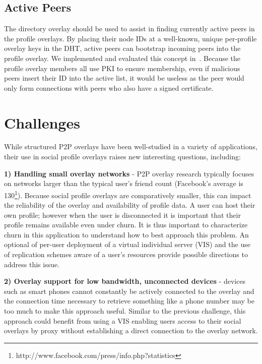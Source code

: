 \documentclass[letterpaper,twocolumn,10pt]{article}
\begin{document}
\subsection{Active Peers}
The directory overlay should be used to assist in finding currently active peers
in the profile overlays.  By placing their node IDs at a well-known, unique
per-profile overlay keys in the DHT, active peers can bootstrap incoming peers
into the profile overlay.  We implemented and evaluated this concept
in~\cite{icdcs10}.  Because the profile overlay members all use PKI to ensure
membership, even if malicious peers insert their ID into the active list, it
would be useless as the peer would only form connections with peers who also
have a signed certificate.

\section{Challenges}
\label{outstanding}
While structured P2P overlays have been well-studied in a variety of applications,
their use in social profile overlays raises new interesting questions, including:

{\bf 1) Handling small overlay networks} - P2P overlay research typically focuses on
networks larger than the typical user's friend count (Facebook's average is
130\footnote{http://www.facebook.com/press/info.php?statistics}).  Because social profile overlays are comparatively smaller, this can
impact the reliability of the overlay and availability of profile data.  A user
can host their own profile; however when the user is disconnected it is important
that their profile remains available even under churn. It is thus important to
characterize churn in this application to understand how to best approach this
problem. An optional of per-user deployment of a virtual individual server (VIS)
and the use of replication schemes aware of a user's resources provide possible
directions to address this issue.

{\bf 2) Overlay support for low bandwidth, unconnected devices} - devices such as
smart phones cannot constantly be actively connected to the overlay and the
connection time necessary to retrieve something like a phone number may be
too much to make this approach useful.  Similar to the previous challenge,
this approach could benefit from using a VIS enabling users access to their
social overlays by proxy without establishing a direct connection to the overlay
network.
\end{document}
